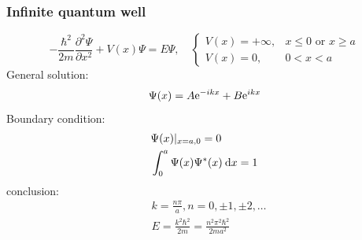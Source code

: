 \documentclass{beamer}
\begin{document}
    \begin{frame} \frametitle{Infinite quantum well}
        \begin{equation*}
            - \frac{\hbar^2}{2m} \frac{\partial^2 \Psi}{\partial x^2} + V(x) \Psi = E \Psi  , \quad \left\{
                \begin{array}{ll}
                    V(x) = + \infty, & x \le 0 \text{ or } x \ge a \\
                    V(x) = 0, & 0 < x < a
                \end{array}
            \right.
        \end{equation*}
        General solution:
        \begin{equation*}
            \Psi (x) = A \mathrm{e}^{-ikx} + B \mathrm{e}^{ikx} 
        \end{equation*}
        Boundary condition:
        \begin{equation*}
            \begin{aligned}
                    & \Psi (x) | _{x = a, 0} = 0 \\
                    & \int_{0}^{a} \Psi(x) \Psi^*(x) \: \mathrm{d} x = 1 \\
            \end{aligned}
        \end{equation*}
        conclusion:
        \begin{equation*}
            \begin{aligned}
                &k = \frac{n\pi}{a} , n = 0, \pm 1, \pm 2, \dots \\
                &E = \frac{k^2 \hbar^2}{2m} = \frac{n^2 \pi^2 \hbar^2}{2m a^2}  
            \end{aligned}
        \end{equation*}
    \end{frame}
\end{document}

